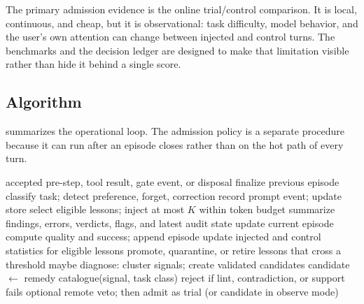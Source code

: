 The primary admission evidence is the online trial/control comparison. It is local, continuous, and cheap, but it is observational: task difficulty, model behavior, and the user's own attention can change between injected and control turns. The benchmarks and the decision ledger are designed to make that limitation visible rather than hide it behind a single score.

\subsection{Algorithm}
\label{sec:algorithm}
 summarizes the operational loop. The admission policy is a separate procedure because it can run after an episode closes rather than on the hot path of every turn.

\begin{algorithm}[t]
\caption{Local RSI turn and admission loop (simplified).}
\label{alg:loop}
\begin{algorithmic}[1]
\Require accepted pre-step, tool result, gate event, or disposal
\Statex
{}
   \State finalize previous episode \EndIf
    \State classify task; detect preference, forget, correction
    \State record prompt event; update store
    \State select eligible lessons; inject at most $K$ within token budget
  \EndIf
\EndProcedure
\Statex
{}
  \State summarize findings, errors, verdicts, flags, and latest audit state
  \State update current episode
\EndProcedure
\Statex
{}
  \State compute quality and success; append episode
  \State update injected and control statistics for eligible lessons
  \State promote, quarantine, or retire lessons that cross a threshold
  \State maybe diagnose: cluster signals; create validated candidates
\EndProcedure
\Statex
{}
    \State candidate $\gets$ remedy catalogue(signal, task class)
    \State reject if lint, contradiction, or support fails
    \State optional remote veto; then admit as trial (or candidate in observe mode)
  \EndFor
\EndProcedure
\end{algorithmic}
\end{algorithm}

